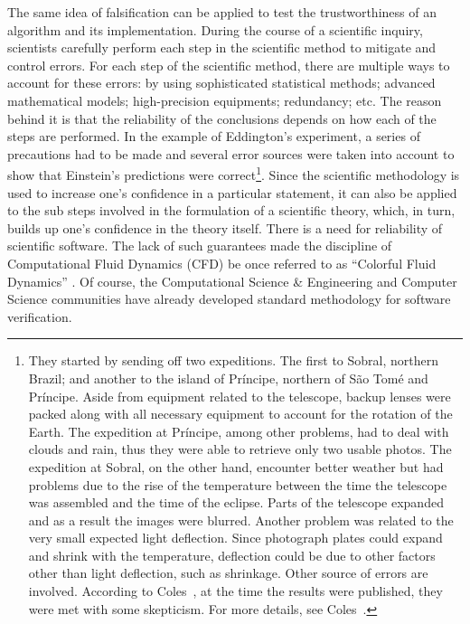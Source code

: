 The same idea of falsification can be applied to test the trustworthiness of an algorithm and its implementation. During the course of a  scientific inquiry, scientists carefully perform each step in the scientific method to mitigate and control errors. For each step of the scientific method, there are multiple ways to account for these errors: by using sophisticated statistical methods; advanced mathematical models; high-precision equipments; redundancy; etc.  The reason behind it is that the reliability of the conclusions depends on how each of the steps are performed. In the example of Eddington's experiment, a series of precautions had to be made and several error sources were taken into account to show that Einstein's predictions were correct\footnote{They started by sending off two expeditions. The first to Sobral, northern Brazil; and another to the island of Pr\'incipe, northern of S\~ao Tom\'e and Pr\'incipe. Aside from equipment related to the telescope, backup lenses were packed along with all necessary equipment to account for the rotation of the Earth. The expedition at Pr\'incipe, among other problems, had to deal with clouds and rain, thus they were able to retrieve only two usable photos. The expedition at Sobral, on the other hand, encounter better weather but had problems due to the rise of the temperature between the time the telescope was assembled and the time of the eclipse. Parts of the telescope expanded and as a result the images were blurred. Another problem was related to the very small expected light deflection. Since photograph plates could expand and shrink with the temperature, deflection could be due to other factors other than light deflection, such as shrinkage. Other source of errors are involved. According to Coles~\cite{coles2001einstein}, at the time the results were published, they were met with some skepticism. For more details, see Coles~\cite{coles2001einstein}.}. 
%
Since the scientific methodology is used to increase one's confidence in a particular statement, it can also be applied to the sub steps involved in the formulation of a scientific theory, which, in turn, builds up one's confidence in the theory itself. 
There is a need for reliability of scientific software. The lack of such guarantees made the discipline of Computational Fluid Dynamics (CFD) be once referred to as ``Colorful Fluid Dynamics'' \cite{meroney2004wind}. Of course, the Computational Science \& Engineering and Computer Science communities have already developed standard methodology for software verification.

